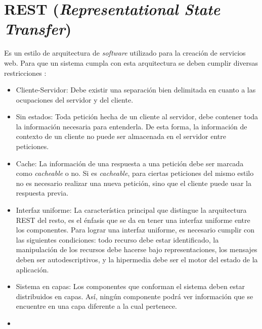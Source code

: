 \section{REST (\textit{Representational State Transfer})}\label{REST}

Es un estilo de arquitectura de \textit{software} utilizado para la creación de servicios web. Para que un sistema cumpla con esta arquitectura se deben cumplir diversas restricciones \cite{REST0}:

\begin{itemize}
	\item Cliente-Servidor: Debe existir una separación bien delimitada en cuanto a las ocupaciones del servidor y del cliente.
	\item Sin estados: Toda petición hecha de un cliente al servidor, debe contener toda la información necesaria para entenderla. De esta forma, la información de contexto de un cliente no puede ser almacenada en el servidor entre peticiones. 
	\item Cache: La información de una respuesta a una petición debe ser marcada como \textit{cacheable} o no. Si es \textit{cacheable}, para ciertas peticiones del mismo estilo no es necesario realizar una nueva petición, sino que el cliente puede usar la respuesta previa.
	\item Interfaz uniforme: La característica principal que distingue la arquitectura REST del resto, es el énfasis que se da en tener una interfaz uniforme entre los componentes. Para lograr una interfaz uniforme, es necesario cumplir con las siguientes condiciones: todo recurso debe estar identificado, la manipulación de los recursos debe hacerse bajo representaciones, los mensajes deben ser autodescriptivos, y la hipermedia debe ser el motor del estado de la aplicación.
	\item Sistema en capas: Los componentes que conforman el sistema deben estar distribuidos en capas. Así, ningún componente podrá ver información que se encuentre en una capa diferente a la cual pertenece.
	\item 
\end{itemize}